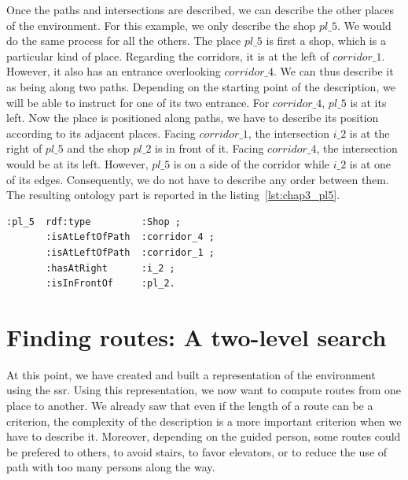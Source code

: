 Once the paths and intersections are described, we can describe the other places of the environment. For this example, we only describe the shop $pl\_5$. We would do the same process for all the others. The place $pl\_5$ is first a shop,  which is a particular kind of place. Regarding the corridors, it is at the left of $corridor\_1$. However, it also has an entrance overlooking $corridor\_4$. We can thus describe it as being along two paths. Depending on the starting point of the description, we will be able to instruct for one of its two entrance. For $corridor\_4$, $pl\_5$ is at its left. Now the place is positioned along paths, we have to describe its position according to its adjacent places. Facing $corridor\_1$, the intersection $i\_2$ is at the right of $pl\_5$ and the shop $pl\_2$ is in front of it. Facing $corridor\_4$, the intersection would be at its left. However, $pl\_5$ is on a side of the corridor while $i\_2$ is at one of its edges. Consequently, we do not have to describe any order  between them. The resulting ontology part is reported in the listing~\ref{lst:chap3_pl5}.

\begin{lstlisting}[frame=single, basicstyle=\scriptsize\ttfamily, label={lst:chap3_pl5}, caption={Description of the shop pl\_5 using the \acrshort{ssr} in the OWL language using the Turle syntax.},captionpos=b, style=OwlTurtle_indiv]
:pl_5  rdf:type         :Shop ;
       :isAtLeftOfPath  :corridor_4 ;
       :isAtLeftOfPath  :corridor_1 ;
       :hasAtRight      :i_2 ;
       :isInFrontOf     :pl_2.
\end{lstlisting}

\section{Finding routes: A two-level search}

At this point, we have created and built a representation of the environment using the \acrfull{ssr}. Using this representation, we now want to compute routes from one place to another. We already saw that even if the length of a route can be a criterion, the complexity of the description is a more important criterion when we have to describe it. Moreover, depending on the guided person, some routes could be prefered to others, to avoid stairs, to favor elevators, or to reduce the use of path with too many persons along the way.

